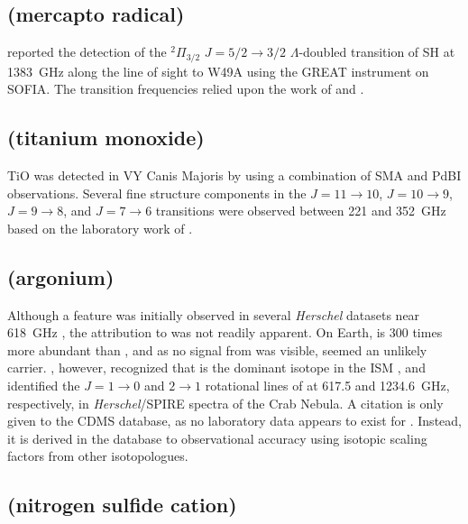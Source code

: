 \documentclass[twocolumn]{aastex631}
\begin{document}
    \subsection{ (mercapto radical)}
    \label{SH}
    
    \citet{Neufeld:2012gz} reported the detection of the $^2\Pi_{3/2}$ $J = 5/2\rightarrow3/2$ $\Lambda$-doubled transition of SH at 1383~GHz along the line of sight to W49A using the GREAT instrument on SOFIA.  The transition frequencies relied upon the work of \citet{Morino:1995oi} and \citet{Klisch:1996mn}.
    
    \subsection{ (titanium monoxide)}
    \label{TiO}
    
    TiO was detected in VY Canis Majoris by \citet{Kaminski:2013gk} using a combination of SMA and PdBI observations.  Several fine structure components in the $J = 11\rightarrow10$, $J = 10\rightarrow9$, $J = 9\rightarrow8$, and $J = 7\rightarrow6$ transitions were observed between 221 and 352~GHz based on the laboratory work of \citet{Namiki:1998id}.
    
    \subsection{ (argonium)}
    \label{ArH+}
    
    Although a feature was initially observed in several \emph{Herschel} datasets near 618~GHz \citep{Neill:2014cb}, the attribution to  was not readily apparent.  On Earth,  is 300 times more abundant than   \citep{Lee:2006bc}, and as no signal from  was visible,  seemed an unlikely carrier.  \citet{Barlow:2013dr}, however, recognized that  is the dominant isotope in the ISM \citep{Cameron:1970dw}, and identified the $J = 1\rightarrow0$ and $2\rightarrow1$ rotational lines of  at 617.5 and 1234.6~GHz, respectively, in \emph{Herschel}/SPIRE spectra of the Crab Nebula.  A citation is only given to the CDMS database, as no laboratory data appears to exist for .  Instead, it is derived in the database to observational accuracy using isotopic scaling factors from other isotopologues.  
    
    \subsection{ (nitrogen sulfide cation)}
    \label{NS+}
    
\end{document}
